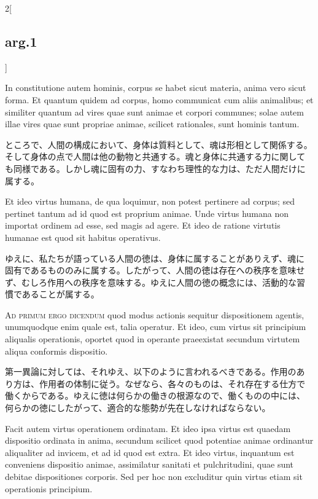 \documentclass[paper=a4paper,fontsize=10pt,jafontsize=9pt,titlepage]{jlreq}
\begin{document}
\begin{paracol}{2}[\subsection{arg.1}]
\switchcolumn*

In constitutione autem hominis, corpus se habet sicut materia, anima
vero sicut forma. Et quantum quidem ad corpus, homo communicat cum
aliis animalibus; et similiter quantum ad vires quae sunt animae et
corpori communes; solae autem illae vires quae sunt propriae animae,
scilicet rationales, sunt hominis tantum.

\switchcolumn

ところで、人間の構成において、身体は質料として、魂は形相として関係する。
そして身体の点で人間は他の動物と共通する。魂と身体に共通する力に関して
も同様である。しかし魂に固有の力、すなわち理性的な力は、ただ人間だけに
属する。

\switchcolumn*

Et ideo virtus humana, de qua loquimur, non potest pertinere ad
corpus; sed pertinet tantum ad id quod est proprium animae. Unde
virtus humana non importat ordinem ad esse, sed magis ad agere. Et
ideo de ratione virtutis humanae est quod sit habitus operativus.

\switchcolumn

ゆえに、私たちが語っている人間の徳は、身体に属することがありえず、魂に
固有であるもののみに属する。したがって、人間の徳は存在への秩序を意味せ
ず、むしろ作用への秩序を意味する。ゆえに人間の徳の概念には、活動的な習
慣であることが属する。

\switchcolumn*[\subsection{ad.1}]

{\scshape Ad primum ergo dicendum} quod modus actionis sequitur
dispositionem agentis, unumquodque enim quale est, talia operatur. Et
ideo, cum virtus sit principium aliqualis operationis, oportet quod in
operante praeexistat secundum virtutem aliqua conformis
dispositio.

\switchcolumn

第一異論に対しては、それゆえ、以下のように言われるべきである。作用のあ
り方は、作用者の体制に従う。なぜなら、各々のものは、それ存在する仕方で
働くからである。ゆえに徳は何らかの働きの根源なので、働くものの中には、
何らかの徳にしたがって、適合的な態勢が先在しなければならない。

\switchcolumn*

Facit autem virtus operationem ordinatam.  Et ideo ipsa virtus est
quaedam dispositio ordinata in anima, secundum scilicet quod potentiae
animae ordinantur aliqualiter ad invicem, et ad id quod est extra. Et
ideo virtus, inquantum est conveniens dispositio animae, assimilatur
sanitati et pulchritudini, quae sunt debitae dispositiones
corporis. Sed per hoc non excluditur quin virtus etiam sit operationis
principium.


\end{paracol}
\end{document}
